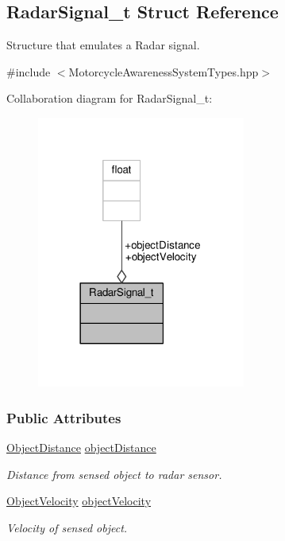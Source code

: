 \hypertarget{structRadarSignal__t}{\subsection{Radar\-Signal\-\_\-t Struct Reference}
\label{structRadarSignal__t}
}


Structure that emulates a Radar signal.  




{\ttfamily \#include $<$Motorcycle\-Awareness\-System\-Types.\-hpp$>$}



Collaboration diagram for Radar\-Signal\-\_\-t\-:\nopagebreak
\begin{figure}[H]
\begin{center}
\leavevmode
\includegraphics[width=194pt]{structRadarSignal__t__coll__graph}
\end{center}
\end{figure}
\subsubsection*{Public Attributes}
\begin{DoxyCompactItemize}
\item 
\hyperlink{MotorcycleAwarenessSystemTypes_8hpp_a6d34a01b51bff9b1cc17900d711a9b76}{Object\-Distance} \hyperlink{structRadarSignal__t_a96938fbfb77f208743a36d3f8b37cccb}{object\-Distance}
\begin{DoxyCompactList}\small\item\em Distance from sensed object to radar sensor. \end{DoxyCompactList}\item 
\hyperlink{MotorcycleAwarenessSystemTypes_8hpp_ae069b9d80ba548bc07502c05a1efaac0}{Object\-Velocity} \hyperlink{structRadarSignal__t_a0bbaf402c80288a0819dbbfaded8a44a}{object\-Velocity}
\begin{DoxyCompactList}\small\item\em Velocity of sensed object. \end{DoxyCompactList}\end{DoxyCompactItemize}


